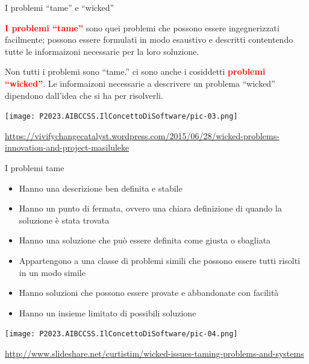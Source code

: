 \documentclass{beamer}
\begin{document}

\begin{frame}{\centerline{I problemi ``tame'' e ``wicked''}}

\begin{small}
\textcolor{red}{\bf I problemi ``tame''} sono quei problemi che possono essere ingegnerizzati facilmente; possono essere formulati in modo esaustivo e descritti contentendo tutte le informaizoni necessarie per la loro soluzione.

Non tutti i problemi sono ``tame.'' ci sono anche i cosiddetti 
\textcolor{red}{\bf problemi ``wicked''}. Le informaizoni necessarie a descrivere un problema ``wicked'' dipendono dall'idea che si ha per risolverli.

\begin{center}
\texttt{[image: P2023.AIBCCSS.IlConcettoDiSoftware/pic-03.png]}
\end{center}

\end{small}

\begin{center}
\tiny
\url{https://vivifychangecatalyst.wordpress.com/2015/06/28/wicked-problems-innovation-and-project-masiluleke}

\end{center}


\end{frame}


\begin{frame}{\centerline{I problemi tame}}

\begin{itemize}
\item Hanno una descrizione ben definita e stabile
\item Hanno un punto di fermata, ovvero una chiara definizione di quando la soluzione \`{e} stata trovata
\item Hanno una soluzione che pu\`{o} essere definita come giusta o sbagliata
\item Appartengono a una classe di problemi simili che possono essere tutti risolti in un modo simile
\item Hanno soluzioni che possono essere provate e abbandonate con facilit\`{a}
\item Hanno un insieme limitato di possibili soluzione
\end{itemize}
\begin{center}
\texttt{[image: P2023.AIBCCSS.IlConcettoDiSoftware/pic-04.png]}
\end{center}

\begin{center}
\tiny
\url{http://www.slideshare.net/curtistim/wicked-issues-taming-problems-and-systems}
\end{center}

\end{frame}
\end{document}
